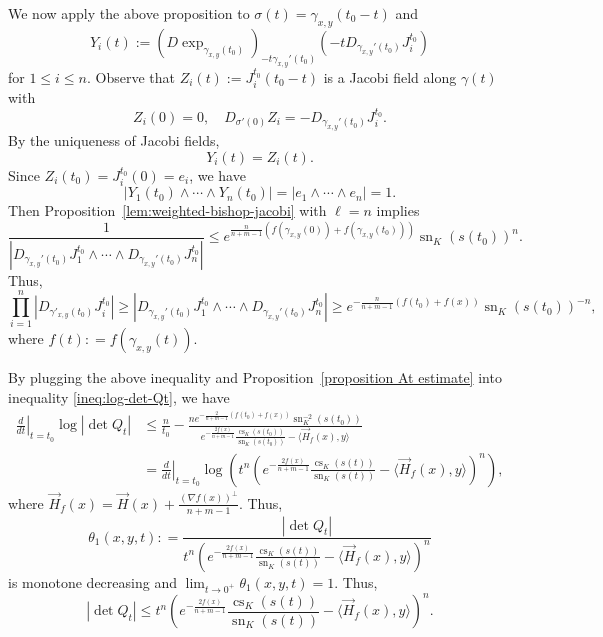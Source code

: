 \documentclass[psamsfonts]{amsart}
\theoremstyle{definition}
\theoremstyle{remark}
\numberwithin{equation}{section}
\begin{document}
We now apply the above proposition to $\sigma(t) = \gamma_{x,y}(t_0 - t)$ and 
$$Y_i (t) := (D\exp_{\gamma_{x,y}(t_0)})_{-t\gamma_{x,y}'(t_0)}\left(-t D_{\gamma_{x,y}'(t_0)}J_i^{t_0}\right)$$
for $1\leq i \leq n$.
Observe that
$Z_i(t):= J_i^{t_0}(t_0-t)$ is a Jacobi field along $\gamma(t)$ with 
$$Z_i ( 0) = 0, \quad  D_{\sigma'(0)}Z_i = -D_{\gamma_{x,y}'(t_0)}J_i^{t_0}.$$
By the uniqueness of Jacobi fields, 
$$Y_i(t) = Z_i(t).$$
Since $ Z_i(t_0) = J_i^{t_0}(0) = e_i$,
we have
$$|Y_1(t_0) \wedge \cdots \wedge Y_n(t_0)| = |e_1 \wedge \cdots \wedge e_n| = 1.$$
Then Proposition~\ref{lem:weighted-bishop-jacobi} with $\ell=n$ implies
$$\frac{1}{\left| D_{\gamma_{x,y}'(t_0)}J_1^{t_0} \wedge \cdots \wedge D_{\gamma_{x,y}'(t_0)}J_n^{t_0}\right|}\leq
e^{\frac{n}{n+m-1}\left(f(\gamma_{x,y}(0))+f(\gamma_{x,y}(t_0))\right)}
\operatorname{sn}_K(s(t_0))^n .$$
Thus,
$$ \prod_{i=1}^n \left| D_{\gamma'_{x,y}(t_0)} J_i^{t_0} \right|  \geq \left| D_{\gamma_{x,y}'(t_0)}J_1^{t_0} \wedge \cdots \wedge D_{\gamma_{x,y}'(t_0)}J_n^{t_0}\right| \geq e^{-\frac{n}{n+m-1}\left(f(t_0)+f(x)\right)}
\operatorname{sn}_K(s(t_0))^{-n},$$
where $f(t) : = f(\gamma_{x,y}(t)).$

By plugging the above inequality and Proposition~\ref{proposition At estimate} into inequality \eqref{ineq:log-det-Qt}, we have
\begin{align*}
    \left.\frac{d}{dt}\right|_{t=t_0} \log |\operatorname{det} Q_t| &\leq \frac{n}{t_0} - \frac{ne^{-\frac{2}{n+m-1} \left( f(t_0) +f(x)\right)} \operatorname{sn}_K^{-2}(s(t_0))}{e^{-\frac{2f(x)}{n+m-1}} \frac{\operatorname{cs}_K(s(t_0))}{\operatorname{sn}_K(s(t_0))} - \langle \vec H_f (x) , y\rangle }\\
    & = \left.\frac{d}{dt}\right|_{t=t_0} \log \left( t^n \left(e^{-\frac{2f(x)}{n+m-1}} \frac{\operatorname{cs}_K(s(t))}{\operatorname{sn}_K(s(t))} - \langle \vec H_f (x) , y\rangle  \right)^n\right),
\end{align*}
where $\vec H_f (x) = \vec H (x) + \frac{(\nabla f(x))^\perp}{n+m-1}$.
Thus,
\begin{equation}\label{def:theta-1}
    \theta_1(x,y,t): = \frac{|\operatorname{det}Q_t|}{t^n \left(e^{-\frac{2f(x)}{n+m-1}} \frac{\operatorname{cs}_K(s(t))}{\operatorname{sn}_K(s(t))} - \langle \vec H_f (x) , y\rangle  \right)^n}
\end{equation}
is monotone decreasing and $\lim_{t \to 0^+} \theta_1(x,y,t) = 1$.
Thus,
\begin{equation}\label{ineq:Qt estimate}
|\operatorname{det}Q_t| \leq t^n \left(e^{-\frac{2f(x)}{n+m-1}} \frac{\operatorname{cs}_K(s(t))}{\operatorname{sn}_K(s(t))} - \langle \vec H_f (x) , y\rangle  \right)^n.
\end{equation}
\end{document}

